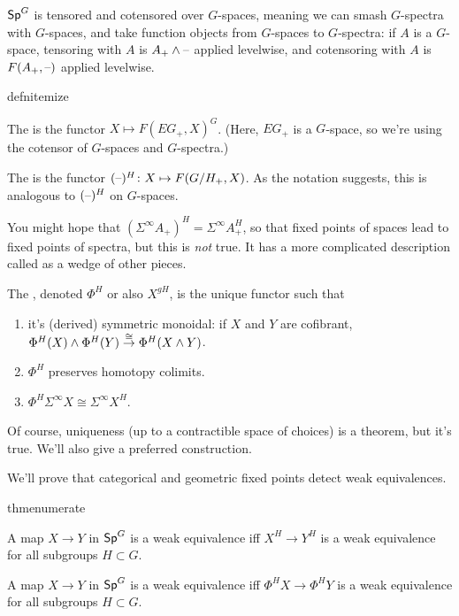 $\mathsf{Sp}^G$ is tensored and cotensored over $G$-spaces, meaning we can smash $G$-spectra with $G$-spaces, and take
function objects from $G$-spaces to $G$-spectra: if $A$ is a $G$-space, tensoring with $A$ is $A_+\wedge\text{--}$
applied levelwise, and cotensoring with $A$ is $F(A_+,\text{--})$ applied levelwise.
\begin{comp}{defn}{itemize}
	\item The  is the functor $X\mapsto F(EG_+, X)^G$. (Here, $EG_+$ is a $G$-space, so
	we're using the cotensor of $G$-spaces and $G$-spectra.)
	\item The  is the functor $(\bl)^H\colon X\mapsto F(G/H_+, X)$. As the notation
	suggests, this is analogous to $(\text{--})^H$ on $G$-spaces.
\end{comp}
\begin{warn}
You might hope that $(\Sigma^\infty A_+)^H = \Sigma^\infty A_+^H$, so that fixed points of spaces lead to fixed
points of spectra, but this is \emph{not} true. It has a more complicated description called  as a wedge of other pieces.
\end{warn}
\begin{defn}
The , denoted $\Phi^H$ or also $X^{gH}$, is the unique functor
such that
\begin{enumerate}
	\item it's (derived) symmetric monoidal: if $X$ and $Y$ are cofibrant,
	$\Phi^H(X)\wedge\Phi^H(Y)\stackrel\cong\to\Phi^H(X\wedge Y)$.
	\item $\Phi^H$ preserves homotopy colimits.
	\item $\Phi^H\Sigma^\infty X \cong \Sigma^\infty X^H$.
\end{enumerate}
\end{defn}
Of course, uniqueness (up to a contractible space of choices) is a theorem, but it's true. We'll also give a
preferred construction.

We'll prove that categorical and geometric fixed points detect weak equivalences.
\begin{comp}{thm}{enumerate}
	\item A map $X\to Y$ in $\mathsf{Sp}^G$ is a weak equivalence iff $X^H\to Y^H$ is a weak equivalence for all subgroups
	$H\subset G$.
	\item A map $X\to Y$ in $\mathsf{Sp}^G$ is a weak equivalence iff $\Phi^H X\to \Phi^H Y$ is a weak equivalence for all
	subgroups $H\subset G$.
\end{comp}

